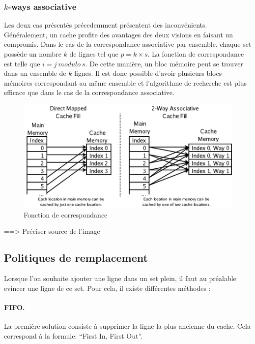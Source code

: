 \subsubsection{$k$-ways associative}
Les deux cas présentés précedemment présentent des inconvénients. Généralement, un cache profite des avantages des deux visions en faisant un compromis. Dans le cas de la correspondance associative par ensemble, chaque set possède un nombre $k$ de lignes tel que $p=k \times s$. La fonction de correspondance est telle que $i = j\ modulo\ s$. De cette manière, un bloc mémoire peut se trouver dans un ensemble de $k$ lignes. Il est donc possible d'avoir plusieurs blocs mémoires correspondant au même ensemble et l'algorithme de recherche est plus efficace que dans le cas de la correspondance associative.

\begin{figure}[!h]
\begin{center}
   \includegraphics[scale=0.60]{associative.png}
   \caption{\label{img:associative} Fonction de correspondance}
\end{center}
\end{figure}

==> Préciser source de l'image\\

\subsection{Politiques de remplacement}
 Lorsque l'on souhaite ajouter une ligne dans un set plein, il faut au préalable evincer une ligne de ce set. Pour cela, il existe différentes méthodes :

\paragraph{FIFO.} La première solution consiste à supprimer la ligne la plus ancienne du cache. Cela correspond à la formule: ``First In, First Out''.


